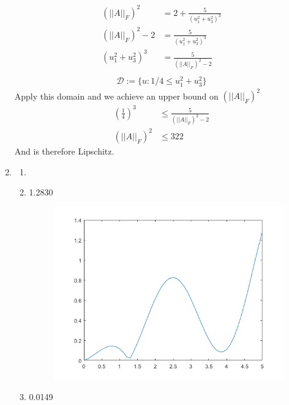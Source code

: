 \documentclass{article}
\begin{document}
\begin{enumerate}
\begin{equation*}
\begin{split}
(\left|\left| A\right|\right|_{F})^{2} & = 2 + \frac{5}{(u_{1}^{2}+u_{3}^{2})^{3}}\\
(\left|\left| A\right|\right|_{F})^{2}-2 & = \frac{5}{(u_{1}^{2}+u_{3}^{2})^{3}}\\
(u_{1}^{2}+u_{3}^{2})^{3} & = \frac{5}{(\left|\left| A\right|\right|_{F})^{2}-2}\\
\end{split}
\end{equation*}
\begin{equation*}
\begin{split}
\mathcal{D} := \{u: 1/4 \leq u_{1}^{2} + u_{3}^{2} \}
\end{split}
\end{equation*}
Apply this domain and we achieve an upper bound on $(\left|\left| A\right|\right|_{F})^{2}$
\begin{equation*}
\begin{split}
(\frac{1}{4})^{3} & \leq \frac{5}{(\left|\left| A\right|\right|_{F})^{2}-2}\\
(\left|\left| A\right|\right|_{F})^{2} &\leq 322
\end{split}
\end{equation*}
And is therefore Lipschitz.
\item
\begin{enumerate}
\item
\item
1.2830
		\begin{figure}[H]
		\includegraphics[scale=.5]{figure1.png}
		\end{figure}
\item
0.0149

\end{enumerate}
\end{enumerate}
\end{document}
